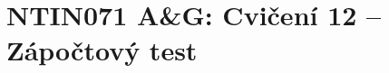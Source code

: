 \documentclass[a4paper,12pt]{amsart}
\begin{document}
\thispagestyle{empty}

\section*{NTIN071 A\&G: Cvičení 12 -- Zápočtový test}


\medskip
\end{document}

